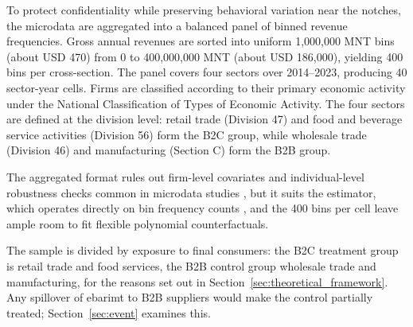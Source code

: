 \documentclass[12pt,oneside,a4paper]{report}
\begin{document}
To protect confidentiality while preserving behavioral variation near the notches, the microdata are aggregated into a balanced panel of binned revenue frequencies. Gross annual revenues are sorted into uniform 1,000,000 MNT bins (about USD 470) from 0 to 400,000,000 MNT (about USD 186,000), yielding 400 bins per cross-section. The panel covers four sectors over 2014–2023, producing 40 sector-year cells. Firms are classified according to their primary economic activity under the National Classification of Types of Economic Activity. The four sectors are defined at the division level: retail trade (Division 47) and food and beverage service activities (Division 56) form the B2C group, while wholesale trade (Division 46) and manufacturing (Section C) form the B2B group.

The aggregated format rules out firm-level covariates and individual-level robustness checks common in microdata studies \parencite{harju2019compliance, liu2021vat, muthitacharoen2021vat}, but it suits the estimator, which operates directly on bin frequency counts \parencite{kleven2016bunching}, and the 400 bins per cell leave ample room to fit flexible polynomial counterfactuals.

The sample is divided by exposure to final consumers: the B2C treatment group is retail trade and food services, the B2B control group wholesale trade and manufacturing, for the reasons set out in Section~\ref{sec:theoretical_framework}. Any spillover of ebarimt to B2B suppliers would make the control partially treated; Section~\ref{sec:event} examines this.
\end{document}
